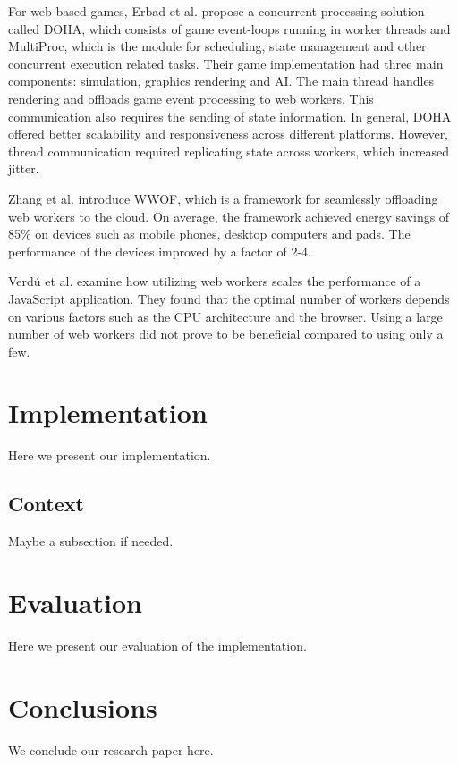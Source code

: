 \documentclass[conference]{IEEEtran}
\begin{document}
For web-based games, Erbad et al. \cite{doha} propose a concurrent processing solution called DOHA, which consists of game event-loops running in worker threads and MultiProc, which is the module for scheduling, state management and other concurrent execution related tasks. Their game implementation had three main components: simulation, graphics rendering and AI. The main thread handles rendering and offloads game event processing to web workers. This communication also requires the sending of state information. In general, DOHA offered better scalability and responsiveness across different platforms. However, thread communication required replicating state across workers, which increased jitter.

Zhang et al. \cite{zhang} introduce WWOF, which is a framework for seamlessly offloading web workers to the cloud. On average, the framework achieved energy savings of 85\% on devices such as mobile phones, desktop computers and pads. The performance of the devices improved by a factor of 2-4.

Verdú et al. \cite{verdu} examine how utilizing web workers scales the performance of a JavaScript application. They found that the optimal number of workers depends on various factors such as the CPU architecture and the browser. Using a large number of web workers did not prove to be beneficial compared to using only a few.

\section{Implementation}
\label{sec:implementation}

Here we present our implementation.

\subsection{Context} 
\label{sec:context}

Maybe a subsection if needed.

\section{Evaluation}
\label{sec:sec2}

Here we present our evaluation of the implementation.

\section{Conclusions}
\label{sec:conc}

We conclude our research paper here.

\printbibliography[title={References}]
\end{document}
